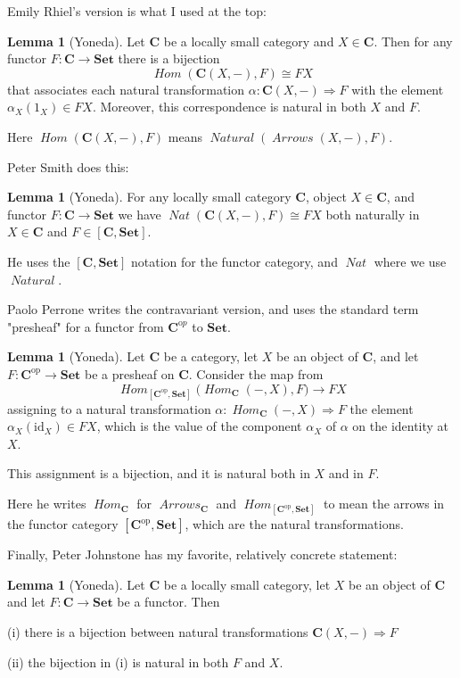 \documentclass[12pt]{article}
\theoremstyle{definition}
\newtheorem{lemma}[thm]{Lemma}
\theoremstyle{definition}
\theoremstyle{definition}
\numberwithin{equation}{section}
\newcommand{\op}{\mathrm{op}}           %
\newcommand{\cat}[1]{\mathbf{#1}}      %
\newcommand{\fcat}[1]{{\mathbf {#1}}}    %
\newcommand{\id}{\mathrm{id}} %
\newcommand{\CC}{\cat{C}}
\newcommand{\CCop}{\cat{C}^{\mathrm op}}
\DeclareMathOperator{\Arrows}{\mathit{Arrows}}
\DeclareMathOperator{\Hom}{\mathit{Hom}}
\DeclareMathOperator{\Nat}{\mathit{Natural}}
\newcommand{\Set}{\fcat{Set}}           %
\newcommand{\iso}{\cong}                %
\newcommand{\fto}{\Rightarrow}
\def\pg{\bigskip\goodbreak
\ni}
\def\ni{\goodbreak\noindent}
\begin{document}
\pg
Emily Rhiel's \cite{Rhiel2016} version is what I used at the top:

\begin{lemma}[Yoneda]\label{yoneda-rhiel} Let $\CC$ be a locally small category and $X \in
\CC$. Then for any functor $F : \CC \to \Set$ there is a bijection
$$
\Hom(\CC(X,-), F) \iso FX
$$
that associates each natural transformation $\alpha:\CC(X,-) \fto F$ with the element
$\alpha_X(1_X) \in FX$. Moreover, this correspondence is natural in both $X$ and $F$.
\end{lemma}
\ni
Here $\Hom(\CC(X,-), F)$ means $\Nat(\Arrows(X,-), F)$.

\pg
Peter Smith \cite{Smith} does this:

\begin{lemma}[Yoneda]\label{yoneda-smith} For any locally small category $\CC$, object $X \in
\CC$, and functor $F:\CC \to \Set$ we have  $\mathop{\mathit{Nat}}(\CC(X,-),F) \iso FX$ both naturally in
$X \in \CC$ and $F \in [\CC, \Set]$.
\end{lemma}
\ni
He uses the $[\CC, \Set]$ notation for the functor category, and $\mathop{\mathit{Nat}}$ where we use $\Nat$.

\pg
Paolo Perrone \cite{Perrone} writes the contravariant version, and uses the standard term "presheaf" 
for a functor from $\CCop$ to $\Set$.

\begin{lemma}[Yoneda]\label{yoneda-perrone} Let $\cat{C}$ be a category, let $X$ be an object of
 $\cat{C}$, and let $F:\cat{C}^\op\to\Set$ be a presheaf on $\cat{C}$. Consider the map
 from
 $$
 \Hom_{[\cat{C}^\op,\Set]} \bigl(\Hom_\cat{C} (-,X) , F \bigr) \to FX
 $$
 assigning to a natural transformation $\alpha:\Hom_\cat{C} (-,X)\fto F$ the element
 $\alpha_X(\id_X)\in FX$, which is the value of the component $\alpha_X$ of $\alpha$ on
 the identity at $X$. 

This assignment is a bijection, and it is natural both in $X$ and in $F$.
\end{lemma}
\ni
Here he writes $\Hom_\CC$ for $\Arrows_\CC$ and 
$\Hom_{[\cat{C}^\op,\Set]}$ to mean the arrows in the functor category $[\cat{C}^\op,\Set]$,
which are the natural transformations.

\bigskip
\noindent
Finally, Peter Johnstone \cite{Johnstone} has my favorite, relatively concrete statement:

\begin{lemma}[Yoneda]\label{yoneda-johnstone} Let $\CC$ be a locally small category, let $X$ be an object of $\CC$
and let $F:\CC \to \Set$ be a functor. Then

(i)  there is a bijection between natural transformations $\CC(X, -) \fto F$

(ii) the bijection in (i) is natural in both $F$ and $X$.
\end{lemma}
\end{document}
